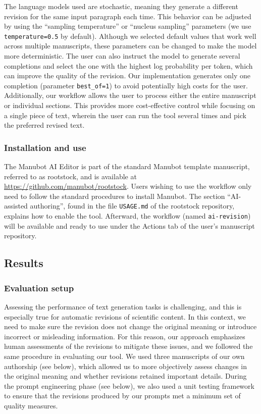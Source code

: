 \documentclass[
]{article}
\begin{document}
The language models used are stochastic, meaning they generate a different revision for the same input paragraph each time.
This behavior can be adjusted by using the ``sampling temperature'' or ``nucleus sampling'' parameters (we use \texttt{temperature=0.5} by default).
Although we selected default values that work well across multiple manuscripts, these parameters can be changed to make the model more deterministic.
The user can also instruct the model to generate several completions and select the one with the highest log probability per token, which can improve the quality of the revision.
Our implementation generates only one completion (parameter \texttt{best\_of=1}) to avoid potentially high costs for the user.
Additionally, our workflow allows the user to process either the entire manuscript or individual sections.
This provides more cost-effective control while focusing on a single piece of text, wherein the user can run the tool several times and pick the preferred revised text.

\hypertarget{installation-and-use}{%
\subsubsection{Installation and use}\label{installation-and-use}}

The Manubot AI Editor is part of the standard Manubot template manuscript, referred to as rootstock, and is available at \url{https://github.com/manubot/rootstock}.
Users wishing to use the workflow only need to follow the standard procedures to install Manubot.
The section ``AI-assisted authoring'', found in the file \texttt{USAGE.md} of the rootstock repository, explains how to enable the tool.
Afterward, the workflow (named \texttt{ai-revision}) will be available and ready to use under the Actions tab of the user's manuscript repository.

\hypertarget{sec:results}{%
\subsection{Results}\label{sec:results}}

\hypertarget{evaluation-setup}{%
\subsubsection{Evaluation setup}\label{evaluation-setup}}

Assessing the performance of text generation tasks is challenging, and this is especially true for automatic revisions of scientific content.
In this context, we need to make sure the revision does not change the original meaning or introduce incorrect or misleading information.
For this reason, our approach emphasizes human assessments of the revisions to mitigate these issues, and we followed the same procedure in evaluating our tool.
We used three manuscripts of our own authorship (see below), which allowed us to more objectively assess changes in the original meaning and whether revisions retained important details.
During the prompt engineering phase (see below), we also used a unit testing framework to ensure that the revisions produced by our prompts met a minimum set of quality measures.
\end{document}
